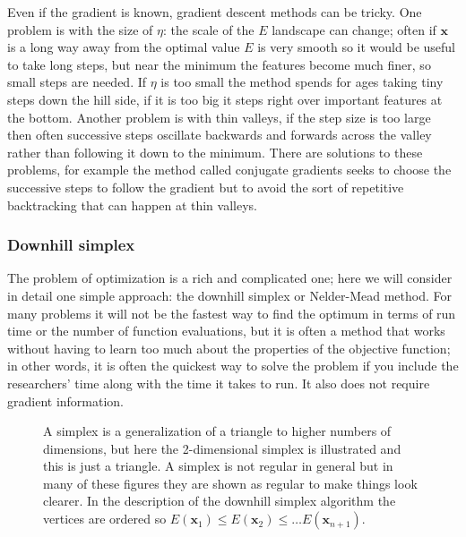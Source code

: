 \documentclass[11pt,a4paper]{scrartcl}
\begin{document}
Even if the gradient is known, gradient descent methods can be
tricky. One problem is with the size of $\eta$: the scale of the $E$
landscape can change; often if $\mathbf{x}$ is a long way away from
the optimal value $E$ is very smooth so it would be useful to take
long steps, but near the minimum the features become much finer, so
small steps are needed. If $\eta$ is too small the method spends for
ages taking tiny steps down the hill side, if it is too big it steps
right over important features at the bottom. Another problem is with
thin valleys, if the step size is too large then often successive
steps oscillate backwards and forwards across the valley rather than
following it down to the minimum. There are solutions to these
problems, for example the method called conjugate gradients seeks to
choose the successive steps to follow the gradient but to avoid the
sort of repetitive backtracking that can happen at thin valleys.

\subsubsection*{Downhill simplex}

The problem of optimization is a rich and complicated one; here we
will consider in detail one simple approach: the downhill simplex or
Nelder-Mead method. For many problems it will not be the fastest way
to find the optimum in terms of run time or the number of function
evaluations, but it is often a method that works without having to
learn too much about the properties of the objective function; in
other words, it is often the quickest way to solve the problem if you
include the researchers' time along with the time it takes to run. It
also does not require gradient information.

\begin{figure}
\begin{center}
\end{center}
\caption{A simplex is a generalization of a triangle to higher numbers
  of dimensions, but here the 2-dimensional simplex is illustrated and
  this is just a triangle. A simplex is not regular in general but in
  many of these figures they are shown as regular to make things look
  clearer. In the description of the downhill simplex algorithm the
  vertices are ordered so $E(\mathbf{x}_1)\le E(\mathbf{x}_2)\le \ldots
  E(\mathbf{x}_{n+1})$.\label{fig:simplex}}
\end{figure}
\end{document}
